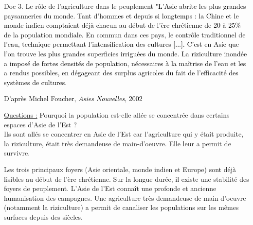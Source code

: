\documentclass{beamer}
\begin{document}
\begin{frame}
\begin{beamerboxesrounded}[scheme=blocimage]{Doc 3. Le rôle de l'agriculture dans le peuplement} 
\textcolor{black}{"L'Asie abrite les plus grandes paysanneries du monde. Tant d'hommes et depuis si longtemps : la Chine et le monde indien comptaient déjà chacun au début de l'ère chrétienne de 20 à 25\% de la population mondiale. En commun dans ces pays, le contrôle traditionnel de l'eau, technique permettant l'intensification des cultures [...]. C'est en Asie que l'on trouve les plus grandes superficies irriguées du monde. La riziculture inondée a imposé de fortes densités de population, nécessaires à la maîtrise de l'eau et les a rendus possibles, en dégageant des surplus agricoles du fait de l'efficacité des systèmes de cultures.}
\begin{flushright}
\textcolor{black}{\tiny D'après Michel Foucher, \textit{Asies Nouvelles}, 2002}
\end{flushright}
\end{beamerboxesrounded}
\end{frame}

\begin{frame}
\underline{Questions :} 
Pourquoi la population est-elle allée se concentrée dans certains espaces d'Asie de l'Est ?\\
\textcolor{black!70!green}{Ils sont allés se concentrer en Asie de l'Est car l'agriculture qui y était produite, la riziculture, était très demandeuse de main-d'oeuvre. Elle leur a permit de survivre.}\\
\end{frame}

\begin{frame}
\setlength{\parindent}{1cm}Les trois principaux foyers (Asie orientale, monde indien et Europe) sont déjà lisibles au début de l'ère chrétienne. Sur la longue durée, il existe une stabilité des foyers de peuplement. 
\vfill
\setlength{\parindent}{1cm} L'Asie de l'Est connaît une profonde et ancienne humanisation des campagnes. Une agriculture très demandeuse de main-d'oeuvre (notamment la riziculture) a permit de canaliser les populations sur les mêmes surfaces depuis des siècles.
\end{frame}



  
\end{document}
